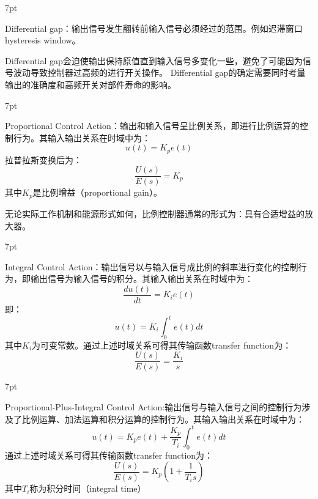 \documentclass{article}
\numberwithin{equation}{section}
\numberwithin{figure}{section}
\newenvironment{formal}{%
\def\FrameCommand{%
\hspace{1pt}%
{\color{DarkBlue}\vrule width 2pt}%
{\color{formalshade}\vrule width 4pt}%
\colorbox{formalshade}%
}%
\MakeFramed{\advance\hsize-\width\FrameRestore}%
\noindent\hspace{-4.55pt}%
\begin{adjustwidth}{}{7pt}%
\vspace{2pt}\vspace{2pt}%
}
{%
\vspace{2pt}\end{adjustwidth}\endMakeFramed%
}
\begin{document}
\begin{formal}
    Differential gap：输出信号发生翻转前输入信号必须经过的范围。例如迟滞窗口hysteresis window。
\end{formal}

Differential gap会迫使输出保持原值直到输入信号多变化一些，避免了可能因为信号波动导致控制器过高频的进行开关操作。
Differential gap的确定需要同时考量输出的准确度和高频开关对部件寿命的影响。

\begin{formal}
    Proportional Control Action：输出和输入信号呈比例关系，即进行比例运算的控制行为。其输入输出关系在时域中为：
    \begin{equation}
            u(t)=K_pe(t)
    \end{equation}
    拉普拉斯变换后为：
    \begin{equation}
        \frac{U(s)}{E(s)}=K_p
\end{equation}
其中$K_p$是比例增益（proportional gain）。
\end{formal}
无论实际工作机制和能源形式如何，比例控制器通常的形式为：具有合适增益的放大器。

\begin{formal}
    Integral Control Action：输出信号以与输入信号成比例的斜率进行变化的控制行为，即输出信号为输入信号的积分。其输入输出关系在时域中为：
    \begin{equation}
        \frac{du(t)}{dt}=K_ie(t)
    \end{equation}
即：
    \begin{equation}
        u(t)=K_i\int_{0}^{t}e(t)dt
    \end{equation}
其中$K_i$为可变常数。通过上述时域关系可得其传输函数transfer function为：
    \begin{equation}
        \frac{U(s)}{E(s)}=\frac{K_i}{s}
    \end{equation}
\end{formal}

\begin{formal}
    Proportional-Plus-Integral Control Action:输出信号与输入信号之间的控制行为涉及了比例运算、加法运算和积分运算的控制行为。其输入输出关系在时域中为：
    \begin{equation}
        u(t)=K_pe(t)+\frac{K_p}{T_i}\int_{0}^{t}e(t)dt
    \end{equation}
    通过上述时域关系可得其传输函数transfer function为：
    \begin{equation}
        \frac{U(s)}{E(s)}=K_p(1+\frac{1}{T_is})
    \end{equation}
    其中$T_i$称为积分时间（integral time）
\end{formal}
\end{document}
